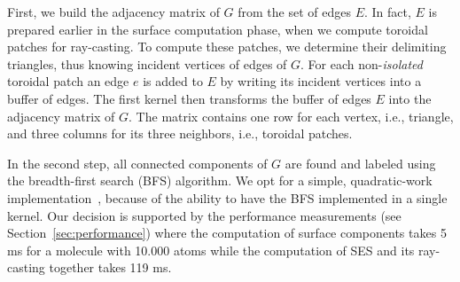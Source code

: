 First, we build the adjacency matrix of $G$ from the set of edges $E$.
In fact, $E$ is prepared earlier in the surface computation phase, when we compute toroidal patches for ray-casting.
To compute these patches, we determine their delimiting triangles, thus knowing incident vertices of edges of $G$.
For each non-\textit{isolated} toroidal patch an edge $e$ is added to $E$ by writing its incident vertices into a buffer of edges.
The first kernel then transforms the buffer of edges $E$ into the adjacency matrix of $G$.
The matrix contains one row for each vertex, i.e., triangle, and three columns for its three neighbors, i.e., toroidal patches.%

In the second step, all connected components of $G$ are found and labeled using the breadth-first search (BFS) algorithm.
We opt for a simple, quadratic-work implementation~\cite{merrill2012scalable}, because of the ability to have the BFS implemented in a single kernel.
Our decision is supported by the performance measurements (see Section~\ref{sec:performance}) where the computation of surface components takes {\tweakedsim}5 ms for a molecule with {\tweakedsim}10.000 atoms while the computation of SES and its ray-casting together takes {\tweakedsim}119 ms.

